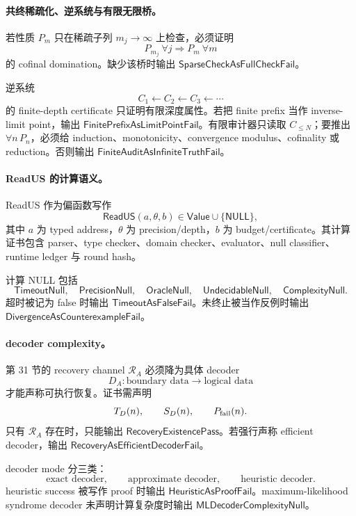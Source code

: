 \paragraph{共终稀疏化、逆系统与有限无限桥。}
若性质 \(P_m\) 只在稀疏子列 \(m_j\to\infty\) 上检查，必须证明
\[
\boxed{
P_{m_j}\ \forall j
\Rightarrow
P_m\ \forall m
}
\]
的 cofinal domination。缺少该桥时输出 \(\mathsf{SparseCheckAsFullCheckFail}\)。

逆系统
\[
C_1\leftarrow C_2\leftarrow C_3\leftarrow\cdots
\]
的 finite-depth certificate 只证明有限深度属性。若把 finite prefix 当作 inverse-limit point，输出 \(\mathsf{FinitePrefixAsLimitPointFail}\)。有限审计器只读取 \(C_{\le N}\)；要推出 \(\forall n\,P_n\)，必须给 induction、monotonicity、convergence modulus、cofinality 或 reduction。否则输出 \(\mathsf{FiniteAuditAsInfiniteTruthFail}\)。

\paragraph{ReadUS 的计算语义。}
ReadUS 作为偏函数写作
\[
\boxed{
\mathsf{ReadUS}(a,\theta,b)
\in
\mathsf{Value}\cup\{\mathsf{NULL}\},
}
\]
其中 \(a\) 为 typed address，\(\theta\) 为 precision/depth，\(b\) 为 budget/certificate。其计算证书包含 parser、type checker、domain checker、evaluator、null classifier、runtime ledger 与 round hash。

计算 NULL 包括
\[
\mathsf{TimeoutNull},\quad
\mathsf{PrecisionNull},\quad
\mathsf{OracleNull},\quad
\mathsf{UndecidableNull},\quad
\mathsf{ComplexityNull}.
\]
超时被记为 false 时输出 \(\mathsf{TimeoutAsFalseFail}\)。未终止被当作反例时输出 \(\mathsf{DivergenceAsCounterexampleFail}\)。

\paragraph{decoder complexity。}
第 31 节的 recovery channel \(\mathcal R_A\) 必须降为具体 decoder
\[
\boxed{
D_A:\text{boundary data}\to\text{logical data}
}
\]
才能声称可执行恢复。证书需声明
\[
T_D(n),\qquad S_D(n),\qquad P_{\rm fail}(n).
\]
只有 \(\mathcal R_A\) 存在时，只能输出 \(\mathsf{RecoveryExistencePass}\)。若强行声称 efficient decoder，输出 \(\mathsf{RecoveryAsEfficientDecoderFail}\)。

decoder mode 分三类：
\[
\text{exact decoder},\qquad
\text{approximate decoder},\qquad
\text{heuristic decoder}.
\]
heuristic success 被写作 proof 时输出 \(\mathsf{HeuristicAsProofFail}\)。maximum-likelihood syndrome decoder 未声明计算复杂度时输出 \(\mathsf{MLDecoderComplexityNull}\)。


